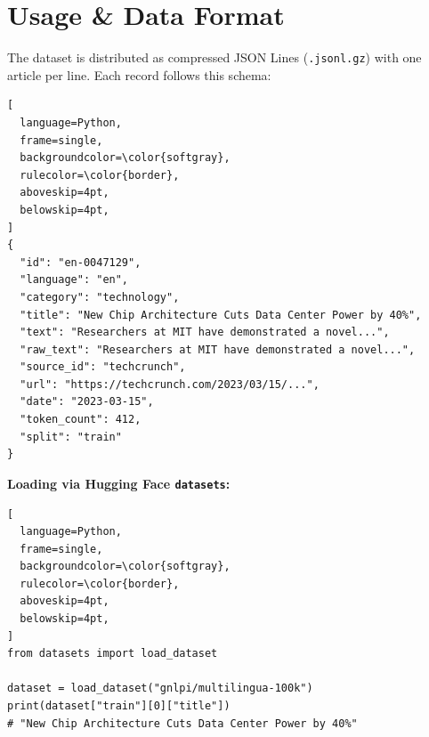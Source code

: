 \section{Usage \& Data Format}

The dataset is distributed as compressed JSON Lines (\texttt{.jsonl.gz}) with one article
per line. Each record follows this schema:

\vspace{4pt}
\begin{lstlisting}[
  language=Python,
  frame=single,
  backgroundcolor=\color{softgray},
  rulecolor=\color{border},
  aboveskip=4pt,
  belowskip=4pt,
]
{
  "id": "en-0047129",
  "language": "en",
  "category": "technology",
  "title": "New Chip Architecture Cuts Data Center Power by 40%",
  "text": "Researchers at MIT have demonstrated a novel...",
  "raw_text": "Researchers at MIT have demonstrated a novel...",
  "source_id": "techcrunch",
  "url": "https://techcrunch.com/2023/03/15/...",
  "date": "2023-03-15",
  "token_count": 412,
  "split": "train"
}
\end{lstlisting}

\smallskip
\textbf{Loading via Hugging Face \texttt{datasets}:}

\vspace{4pt}
\begin{lstlisting}[
  language=Python,
  frame=single,
  backgroundcolor=\color{softgray},
  rulecolor=\color{border},
  aboveskip=4pt,
  belowskip=4pt,
]
from datasets import load_dataset

dataset = load_dataset("gnlpi/multilingua-100k")
print(dataset["train"][0]["title"])
# "New Chip Architecture Cuts Data Center Power by 40%"
\end{lstlisting}

